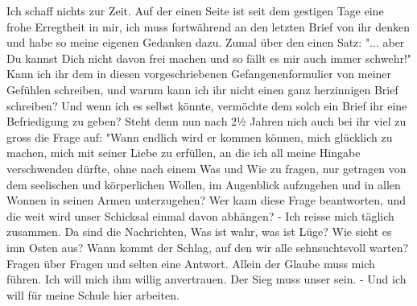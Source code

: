\def\day{19. 10. 1943}
\mktitle

Ich schaff nichts zur Zeit.
Auf der einen Seite ist seit dem gestigen Tage eine frohe Erregtheit in mir, ich muss fortw\"{a}hrend an den letzten Brief von ihr denken und habe so meine eigenen Gedanken dazu.
Zumal \"{u}ber den einen Satz: "... aber Du kannst Dich nicht davon frei machen und so f\"{a}llt es mir auch immer schwehr!"
Kann ich ihr dem in diesen vorgeschriebenen Gefangenenformulier von meiner Gef\"{u}hlen schreiben, und warum kann ich ihr nicht einen ganz herzinnigen Brief schreiben?
Und wenn ich es selbst k\"{o}nnte, verm\"{o}chte dem solch ein Brief ihr eine Befriedigung zu geben?
Steht denn nun nach 2½ Jahren nich auch bei ihr viel zu gross die Frage auf: "Wann endlich wird er kommen k\"{o}nnen, mich gl\"{u}cklich zu machen, mich mit seiner Liebe zu erf\"{u}llen, an die ich all meine Hingabe verschwenden d\"{u}rfte, ohne nach einem Was und Wie zu fragen, nur getragen von dem seelischen und k\"{o}rperlichen Wollen, im Augenblick aufzugehen und in allen Wonnen in seinen Armen unterzugehen?
Wer kann diese Frage beantworten, und die weit wird unser Schicksal einmal davon abh\"{a}ngen?
- Ich reisse mich t\"{a}glich zusammen.
Da sind die Nachrichten,
Was ist wahr, was ist L\"{u}ge?
Wie sieht es imn Osten aus?
Wann kommt der Schlag, auf den wir alle sehnsuchtsvoll warten?
Fragen \"{u}ber Fragen und selten eine Antwort.
Allein der Glaube muss mich f\"{u}hren.
Ich will mich ihm willig anvertrauen.
Der Sieg muss unser sein.
- Und ich will f\"{u}r meine Schule hier arbeiten.

\clearpage
